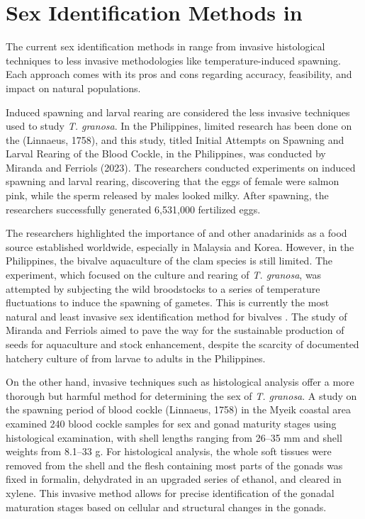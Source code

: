 {\section{Sex Identification Methods in \Tgranosa}

The current sex identification methods in \Tegillarcagranosa range from invasive histological techniques to less invasive methodologies like temperature-induced spawning. Each approach comes with its pros and cons regarding accuracy, feasibility, and impact on natural populations.

Induced spawning and larval rearing are considered the less invasive techniques used to study \textit{T. granosa}. In the Philippines, limited research has been done on the \Tgranosa (Linnaeus, 1758), and this study, titled Initial Attempts on Spawning and Larval Rearing of the Blood Cockle, \Tgranosa in the Philippines, was conducted by Miranda and Ferriols (2023). The researchers conducted experiments on induced spawning and larval rearing, discovering that the eggs of female \Tgranosa were salmon pink, while the sperm released by males looked milky. After spawning, the researchers successfully generated 6,531,000 fertilized eggs.

The researchers highlighted the importance of \Tgranosa and other anadarinids as a food source established worldwide, especially in Malaysia and Korea. However, in the Philippines, the bivalve aquaculture of the clam species is still limited. The experiment, which focused on the culture and rearing of \textit{T. granosa}, was attempted by subjecting the wild broodstocks to a series of temperature fluctuations to induce the spawning of gametes. This is currently the most natural and least invasive sex identification method for bivalves \cite{aji}. The study of Miranda and Ferriols aimed to pave the way for the sustainable production of \Tgranosa seeds for aquaculture and stock enhancement, despite the scarcity of documented hatchery culture of \Tgranosa from larvae to adults in the Philippines.

On the other hand, invasive techniques such as histological analysis offer a more thorough but harmful method for determining the sex of \textit{T. granosa}. A study on the spawning period of blood cockle \Tgranosa (Linnaeus, 1758) in the Myeik coastal area examined 240 blood cockle samples for sex and gonad maturity stages using histological examination, with shell lengths ranging from 26–35 mm and shell weights from 8.1–33 g. For histological analysis, the whole soft tissues were removed from the shell and the flesh containing most parts of the gonads was fixed in formalin, dehydrated in an upgraded series of ethanol, and cleared in xylene. This invasive method allows for precise identification of the gonadal maturation stages based on cellular and structural changes in the gonads.

}
